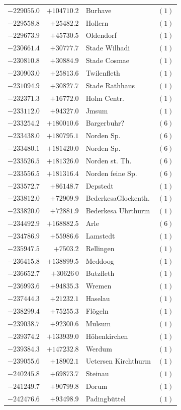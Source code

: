 \begin{center}
\begin{tabular}{r|r|p{170pt}|r}
\(-229055.0\)&\(+104710.2\)&Burhave&\((1)\)\\
\(-229558.8\)&\(+25482.2\)&Hollern&\((1)\)\\
\(-229673.9\)&\(+45730.5\)&Oldendorf&\((1)\)\\
\(-230661.4\)&\(+30777.7\)&Stade Wilhadi&\((1)\)\\
\(-230810.8\)&\(+30884.9\)&Stade Cosmae&\((1)\)\\
\(-230903.0\)&\(+25813.6\)&Twilenfleth&\((1)\)\\
\(-231094.9\)&\(+30827.7\)&Stade Rathhaus&\((1)\)\\
\(-232371.3\)&\(+16772.0\)&Holm Centr.&\((1)\)\\
\(-233112.0\)&\(+94327.0\)&Jmsum&\((1)\)\\
\(-233254.2\)&\(+180010.6\)&Bargerbuhr?&\((6)\)\\
\(-233438.0\)&\(+180795.1\)&Norden Sp.&\((6)\)\\
\(-233480.1\)&\(+181420.0\)&Norden Sp.&\((6)\)\\
\(-233526.5\)&\(+181326.0\)&Norden st. Th.&\((6)\)\\
\(-233556.5\)&\(+181316.4\)&Norden feine Sp.&\((6)\)\\
\(-233572.7\)&\(+86148.7\)&Depstedt&\((1)\)\\
\(-233812.0\)&\(+72909.9\)&BederkesaGlockenth.&\((1)\)\\
\(-233820.0\)&\(+72881.9\)&Bederkesa Uhrthurm&\((1)\)\\
\(-234492.9\)&\(+168882.5\)&Arle&\((6)\)\\
\(-234786.9\)&\(+55986.6\)&Lamstedt&\((1)\)\\
\(-235947.5\)&\(+7503.2\)&Rellingen&\((1)\)\\
\(-236415.8\)&\(+138899.5\)&Meddoog&\((1)\)\\
\(-236652.7\)&\(+30626\,0\)&Butzfleth&\((1)\)\\
\(-236993.6\)&\(+94835.3\)&Wremen&\((1)\)\\
\(-237444.3\)&\(+21232.1\)&Haselau&\((1)\)\\
\(-238299.4\)&\(+75255.3\)&Flögeln&\((1)\)\\
\(-239038.7\)&\(+92300.6\)&Mulsum&\((1)\)\\
\(-239374.2\)&\(+133939.0\)&Höhenkirchen&\((1)\)\\
\(-239384.3\)&\(+147232.8\)&Werdum&\((1)\)\\
\(-239055.6\)&\(+18902.1\)&Uetersen Kirchthurm&\((1)\)\\
\(-240245.8\)&\(+69873.7\)&Steinau&\((1)\)\\
\(-241249.7\)&\(+90799.8\)&Dorum&\((1)\)\\
\(-242476.6\)&\(+93498.9\)&Padingbüttel&\((1)\)\\
\hline\end{tabular}\endgroup\end{center}
